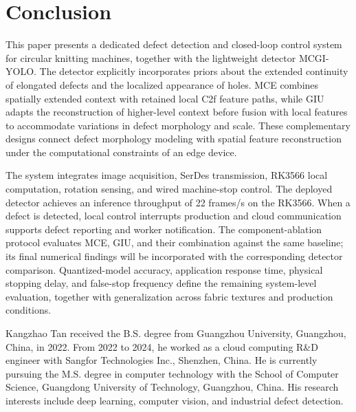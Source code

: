\documentclass[journal]{IEEEtran}
\newcommand{\model}{MCGI-YOLO\xspace}
\begin{document}
\section{Conclusion}
This paper presents a dedicated defect detection and closed-loop control system for circular knitting machines, together with the lightweight detector \model. The detector explicitly incorporates priors about the extended continuity of elongated defects and the localized appearance of holes. MCE combines spatially extended context with retained local C2f feature paths, while GIU adapts the reconstruction of higher-level context before fusion with local features to accommodate variations in defect morphology and scale. These complementary designs connect defect morphology modeling with spatial feature reconstruction under the computational constraints of an edge device.

The system integrates image acquisition, SerDes transmission, RK3566 local computation, rotation sensing, and wired machine-stop control. The deployed detector achieves an inference throughput of 22 frames/s on the RK3566. When a defect is detected, local control interrupts production and cloud communication supports defect reporting and worker notification. The component-ablation protocol evaluates MCE, GIU, and their combination against the same baseline; its final numerical findings will be incorporated with the corresponding detector comparison. Quantized-model accuracy, application response time, physical stopping delay, and false-stop frequency define the remaining system-level evaluation, together with generalization across fabric textures and production conditions.




\begin{IEEEbiographynophoto}{Kangzhao Tan}
received the B.S. degree from Guangzhou University, Guangzhou, China, in 2022. From 2022 to 2024, he worked as a cloud computing R\&D engineer with Sangfor Technologies Inc., Shenzhen, China. He is currently pursuing the M.S. degree in computer technology with the School of Computer Science, Guangdong University of Technology, Guangzhou, China. His research interests include deep learning, computer vision, and industrial defect detection.
\end{IEEEbiographynophoto}
\end{document}
